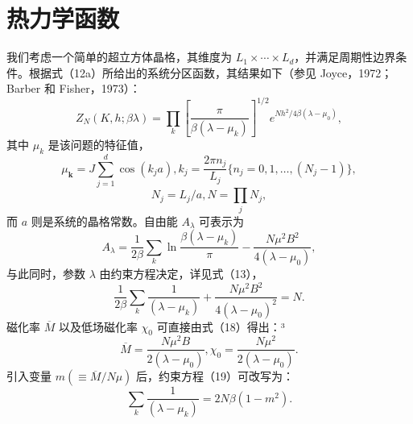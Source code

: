 \section{热力学函数}\label{ux70edux529bux5b66ux51fdux6570}
我们考虑一个简单的超立方体晶格，其维度为 \(L_1 \times \cdots \times L_d\)，并满足周期性边界条件。根据式（12a）所给出的系统分区函数，其结果如下（参见 Joyce，1972；Barber 和 Fisher，1973）：
\begin{equation}\tag{13.4.45}\label{eq:13.4.45}
Z _ { N } ( K , h ; \beta \lambda ) = \prod _ { k } \left[ \frac { \pi } { \beta ( \lambda - \mu _ { k } ) } \right] ^{1 / 2} e ^{N h ^ { 2} / 4 \beta ( \lambda - \mu _ { 0 } ) } ,
\end{equation}
其中 \(\mu_{k}\) 是该问题的特征值，
\begin{equation}\tag{13.4.46}\label{eq:13.4.46}
\mu _ { \mathbf { k } } = J \sum _ { j = 1 } ^{d} \cos ( k _ { j } a ) ,  k _ { j } = \frac { 2 \pi n _ { j } } { L _ { j } }  \{ n _ { j } = 0 , 1 , \ldots , ( N _ { j } - 1 ) \} ,
\end{equation}
\begin{equation}\tag{13.4.47}\label{eq:13.4.47}
N _ { j } = L _ { j } / a ,  N = \prod _ { j } N _ { j } ,
\end{equation}
而 \(a\) 则是系统的晶格常数。自由能 \(A_{\lambda}\) 可表示为
\begin{equation}\tag{13.4.48}\label{eq:13.4.48}
A _ { \lambda } = \frac { 1 } { 2 \beta } \sum _ { k } \ln \frac { \beta ( \lambda - \mu _ { k } ) } { \pi } - \frac { N \mu ^{2} B ^{2} } { 4 ( \lambda - \mu _ { 0 } ) } ,
\end{equation}
与此同时，参数 \(\lambda\) 由约束方程决定，详见式（13），
\begin{equation}\tag{13.4.49}\label{eq:13.4.49}
\frac { 1 } { 2 \beta } \sum _ { k } \frac { 1 } { ( \lambda - \mu _ { k } ) } + \frac { N \mu ^{2} B ^{2} } { 4 ( \lambda - \mu _ { 0 } ) ^{2} } = N .
\end{equation}
磁化率 \(\overline{M}\) 以及低场磁化率 \(\chi_{0}\) 可直接由式（18）得出：³
\begin{equation}\tag{13.4.50}\label{eq:13.4.50}
\overline { { { M } } } = \frac { N \mu ^{2} B } { 2 ( \lambda - \mu _ { 0 } ) } ,  \chi _ { 0 } = \frac { N \mu ^{2} } { 2 ( \lambda - \mu _ { 0 } ) } .
\end{equation}
引入变量 \(m(\equiv\overline{M}/N\mu)\) 后，约束方程（19）可改写为：
\begin{equation}\tag{13.4.51}\label{eq:13.4.51}
\sum _ { k } \frac { 1 } { ( \lambda - \mu _ { k } ) } = 2 N \beta ( 1 - m ^{2} ) .
\end{equation}
